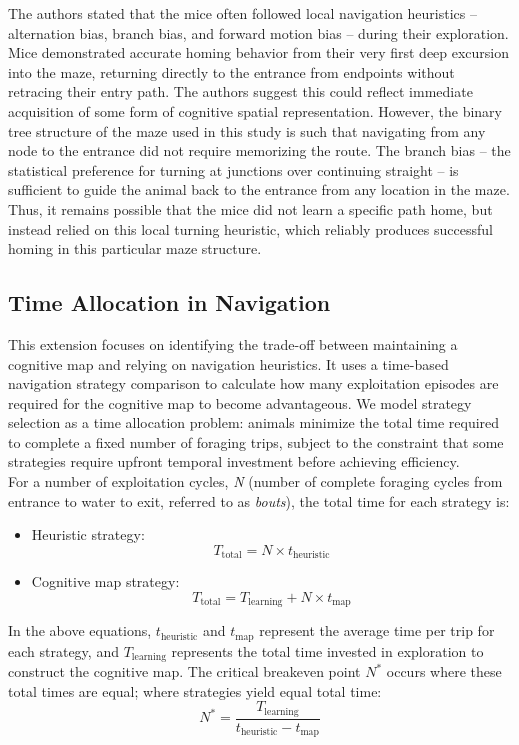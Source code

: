 The authors stated that the mice often followed local navigation heuristics – alternation bias, branch bias, and forward motion bias – during their exploration. Mice demonstrated accurate homing behavior from their very first deep excursion into the maze, returning directly to the entrance from endpoints without retracing their entry path. The authors suggest this could reflect immediate acquisition of some form of cognitive spatial representation. However, the binary tree structure of the maze used in this study is such that navigating from any node to the entrance did not require memorizing the route. The branch bias – the statistical preference for turning at junctions over continuing straight – is sufficient to guide the animal back to the entrance from any location in the maze. Thus, it remains possible that the mice did not learn a specific path home, but instead relied on this local turning heuristic, which reliably produces successful homing in this particular maze structure.

\subsection{Time Allocation in Navigation}
This extension focuses on identifying the trade-off between maintaining a cognitive map and relying on navigation heuristics. It uses a time-based navigation strategy comparison to calculate how many exploitation episodes are required for the cognitive map to become advantageous. We model strategy selection as a time allocation problem: animals minimize the total time required to complete a fixed number of foraging trips, subject to the constraint that some strategies require upfront temporal investment before achieving efficiency.\\
For a number of exploitation cycles, \textit{N} (number of complete foraging cycles from entrance to water to exit, referred to as \textit{bouts}), the total time for each strategy is:

\begin{itemize}
\item Heuristic strategy:
\[
T_{\text{total}} = N \times t_{\text{heuristic}}
\]

\item Cognitive map strategy:
\[
T_{\text{total}} = T_{\text{learning}} + N \times t_{\text{map}}
\]
\end{itemize}

In the above equations, $t_{\text{heuristic}}$ and $t_{\text{map}}$ represent the average time per trip for each strategy, and $T_{\text{learning}}$ represents the total time invested in exploration to construct the cognitive map. The critical breakeven point $N^*$ occurs where these total times are equal; where strategies yield equal total time:
\[
N^* = \frac{T_{\text{learning}}}{t_{\text{heuristic}} - t_{\text{map}}}
\]

